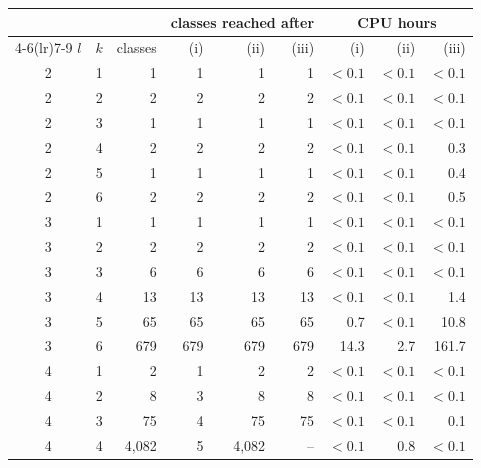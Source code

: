 \begin{tabular}{c c r r r r r r r}
\toprule
 & & & \multicolumn{3}{c}{classes reached after} & \multicolumn{3}{c}{CPU hours} \\
\cmidrule(lr){4-6}\cmidrule(lr){7-9}
$l$ & $k$ & classes & (i) & (ii) & (iii) & (i) & (ii) & (iii) \\
\midrule
2 & 1 & 1 & 1 & 1 & 1 & $<0.1$ & $<0.1$ & $<0.1$ \\
2 & 2 & 2 & 2 & 2 & 2 & $<0.1$ & $<0.1$ & $<0.1$ \\
2 & 3 & 1 & 1 & 1 & 1 & $<0.1$ & $<0.1$ & $<0.1$ \\
2 & 4 & 2 & 2 & 2 & 2 & $<0.1$ & $<0.1$ & 0.3 \\
2 & 5 & 1 & 1 & 1 & 1 & $<0.1$ & $<0.1$ & 0.4 \\
2 & 6 & 2 & 2 & 2 & 2 & $<0.1$ & $<0.1$ & 0.5 \\
3 & 1 & 1 & 1 & 1 & 1 & $<0.1$ & $<0.1$ & $<0.1$ \\
3 & 2 & 2 & 2 & 2 & 2 & $<0.1$ & $<0.1$ & $<0.1$ \\
3 & 3 & 6 & 6 & 6 & 6 & $<0.1$ & $<0.1$ & $<0.1$ \\
3 & 4 & 13 & 13 & 13 & 13 & $<0.1$ & $<0.1$ & 1.4 \\
3 & 5 & 65 & 65 & 65 & 65 & 0.7 & $<0.1$ & 10.8 \\
3 & 6 & 679 & 679 & 679 & 679 & 14.3 & 2.7 & 161.7 \\
4 & 1 & 2 & 1 & 2 & 2 & $<0.1$ & $<0.1$ & $<0.1$ \\
4 & 2 & 8 & 3 & 8 & 8 & $<0.1$ & $<0.1$ & $<0.1$ \\
4 & 3 & 75 & 4 & 75 & 75 & $<0.1$ & $<0.1$ & 0.1 \\
4 & 4 & 4{,}082 & 5 & 4{,}082 & -- & $<0.1$ & 0.8 & $<0.1$ \\
\bottomrule
\end{tabular}
